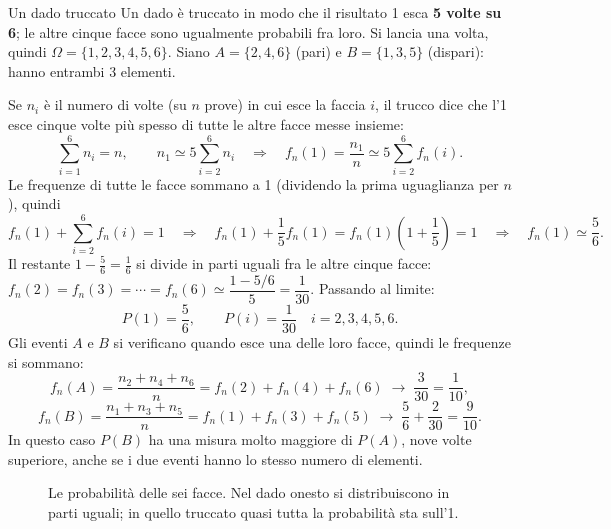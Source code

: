\begin{esempio}{Un dado truccato}
Un dado è truccato in modo che il risultato 1 esca \textbf{5 volte su 6}; le altre cinque facce sono ugualmente
probabili fra loro. Si lancia una volta, quindi $\Omega = \{1, 2, 3, 4, 5, 6\}$. Siano $A = \{2, 4, 6\}$ (pari) e
$B = \{1, 3, 5\}$ (dispari): hanno entrambi 3 elementi.

Se $n_i$ è il numero di volte (su $n$ prove) in cui esce la faccia $i$, il trucco dice che l'1 esce cinque volte più
spesso di tutte le altre facce messe insieme:
\[ \sum_{i=1}^{6} n_i = n , \qquad n_1 \simeq 5 \sum_{i=2}^{6} n_i
   \quad\Longrightarrow\quad f_n(1) = \frac{n_1}{n} \simeq 5 \sum_{i=2}^{6} f_n(i) . \]
Le frequenze di tutte le facce sommano a 1 (dividendo la prima uguaglianza per $n$), quindi
\[
  f_n(1) + \sum_{i=2}^{6} f_n(i) = 1
  \quad\Longrightarrow\quad
  f_n(1) + \frac{1}{5} f_n(1) = f_n(1) \left( 1 + \frac{1}{5} \right) = 1
  \quad\Longrightarrow\quad
  f_n(1) \simeq \frac{5}{6} .
\]
Il restante $1 - \frac56 = \frac16$ si divide in parti uguali fra le altre cinque facce:
$f_n(2) = f_n(3) = \cdots = f_n(6) \simeq \dfrac{1 - 5/6}{5} = \dfrac{1}{30}$. Passando al limite:
\[ P(1) = \frac{5}{6} , \qquad P(i) = \frac{1}{30} \quad i = 2, 3, 4, 5, 6 . \]
Gli eventi $A$ e $B$ si verificano quando esce una delle loro facce, quindi le frequenze si sommano:
\[
  f_n(A) = \frac{n_2 + n_4 + n_6}{n} = f_n(2) + f_n(4) + f_n(6) \;\longrightarrow\; \frac{3}{30} = \frac{1}{10} ,
\]
\[
  f_n(B) = \frac{n_1 + n_3 + n_5}{n} = f_n(1) + f_n(3) + f_n(5) \;\longrightarrow\; \frac{5}{6} + \frac{2}{30} =
  \frac{9}{10} .
\]
In questo caso $P(B)$ ha una misura molto maggiore di $P(A)$, nove volte superiore, anche se i due eventi hanno lo
stesso numero di elementi.
\end{esempio}

\begin{figure}[H]
\centering
{}
\caption{Le probabilità delle sei facce. Nel dado onesto si distribuiscono in parti uguali; in quello truccato quasi
tutta la probabilità sta sull'1.}
\end{figure}

